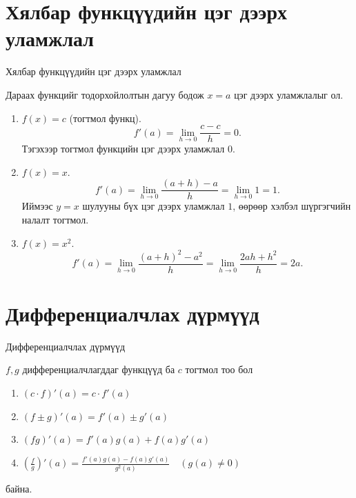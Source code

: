 \section{Хялбар функцүүдийн цэг дээрх уламжлал}
\begin{frame}[allowframebreaks]{Хялбар функцүүдийн цэг дээрх уламжлал}
\begin{example}
Дараах функцийг тодорхойлолтын дагуу бодож $x=a$ цэг дээрх уламжлалыг ол.
\begin{enumerate}
  \item $f(x)=c$ (тогтмол функц).  
  \[
  f'(a)=\lim_{h\to0}\frac{c-c}{h}=0.
  \]
  Тэгэхээр тогтмол функцийн цэг дээрх уламжлал $0$.
  
  \item $f(x)=x$.  
  \[
  f'(a)=\lim_{h\to0}\frac{(a+h)-a}{h}=\lim_{h\to0}1=1.
  \]
  Иймээс $y=x$ шулууны бүх цэг дээрх уламжлал $1$, өөрөөр хэлбэл шүргэгчийн налалт тогтмол.
  
  \item $f(x)=x^2$.  
  \[
  f'(a)=\lim_{h\to0}\frac{(a+h)^2-a^2}{h}=\lim_{h\to0}\frac{2ah+h^2}{h}=2a.
  \]
\end{enumerate}
\end{example}
\end{frame}

\section{Дифференциалчлах дүрмүүд}
\begin{frame}[allowframebreaks]{Дифференциалчлах дүрмүүд}
\begin{theorem}
$f,g$ дифференциалчлагддаг функцүүд ба  $c$ тогтмол тоо бол
\begin{enumerate}
    \item $(c\cdot f)'(a)=c\cdot f'(a)$
    \item $(f\pm g)'(a)=f'(a)\pm g'(a)$
    \item $(fg)'(a)=f'(a)g(a)+f(a)g'(a)$
    \item $
\left(\frac{f}{g}\right)'(a)=\frac{f'(a)g(a) - f(a)g'(a)}{g^2(a)}\quad (g(a)\ne 0)$
\end{enumerate}
байна.
\end{theorem}
\end{frame}

